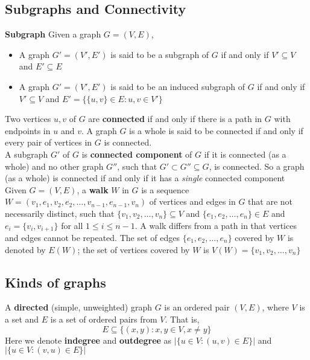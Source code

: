 \documentclass[11pt]{article}
\begin{document}
\subsection*{Subgraphs and Connectivity}

\textbf{Subgraph} Given a graph $G = (V,E)$,
\begin{itemize}
  \item A graph $G' = (V', E')$ is said to be a subgraph of $G$ if and only if $V'\subseteq V$ and $E'\subseteq E$
  \item A graph $G' = (V', E')$ is said to be an induced subgraph of $G$ if and only if $V'\subseteq V$ and $E'= \{ \{ u,v\} \in E: u,v\in V'\}$
\end{itemize}
\begin{rem}
  Two vertices $u,v$ of $G$ are \textbf{connected} if and only if there is a path in $G$ with endpoints in $u$ and $v$. A graph $G$ is a whole is said to be connected if and only if every pair of vertices in $G$ is connected. \\
  A subgraph $G'$ of $G$ is \textbf{connected component} of $G$ if it is connected (as a whole) and no other graph $G''$, such that $G' \subset G'' \subseteq G$, is connected. So a graph (as a whole) is connected if and only if it has a \textit{single} connected component \\
  Given $G = (V,E)$, a \textbf{walk} $W$ in $G$ is a sequence $W = (v_1, e_1, v_2, e_2, \dots, v_{n-1}, e_{n-1}, v_n)$ of vertices and edges in $G$ that are not necessarily distinct, such that $\{ v_1, v_2, \dots , v_n\} \subseteq V$ and $\{ e_1, e_2, \dots , e_n\}\in E$ and $e_i = \{ v_i, v_{i+1}\}$ for all $1\leq i\leq n-1$. A walk differs from a path in that vertices and edges cannot be repeated. The set of edges $\{ e_1, e_2, \dots , e_n \}$ covered by $W$ is denoted by $E(W)$; the set of vertices covered by $W$ is $V(W) = \{ v_1, v_2, \dots, v_n\}$
\end{rem}


\subsection*{Kinds of graphs}

A \textbf{directed} (simple, unweighted) graph $G$ is an ordered pair $(V,E)$, where $V$ is a set and $E$ is a set of ordered pairs from $V$. That is,
\[
  E\subseteq \{ (x,y): x,y\in V, x\neq y\}
\]
Here we denote \textbf{indegree} and \textbf{outdegree} as $| \{ u\in V: (u,v)\in E\} |$ and $| \{ u\in V: (v,u)\in E\} |$
\end{document}
